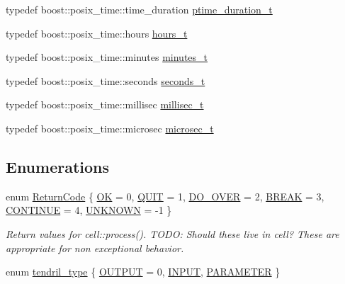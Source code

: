 \begin{DoxyCompactItemize}
\item 
typedef \*
boost\-::posix\-\_\-time\-::time\-\_\-duration \hyperlink{namespaceecto_a0952d5ebd059cbd79b978ecab9ec781c}{ptime\-\_\-duration\-\_\-t}
\item 
typedef boost\-::posix\-\_\-time\-::hours \hyperlink{namespaceecto_a477c167c1e1288b689db5872f650540e}{hours\-\_\-t}
\item 
typedef boost\-::posix\-\_\-time\-::minutes \hyperlink{namespaceecto_ad57e5ebf1455dd895ce11804e47669e5}{minutes\-\_\-t}
\item 
typedef boost\-::posix\-\_\-time\-::seconds \hyperlink{namespaceecto_ae14f91b3661ad9cb774590b15407742c}{seconds\-\_\-t}
\item 
typedef boost\-::posix\-\_\-time\-::millisec \hyperlink{namespaceecto_ab1f4721cc3b311f9615b3092d291260b}{millisec\-\_\-t}
\item 
typedef boost\-::posix\-\_\-time\-::microsec \hyperlink{namespaceecto_affe36dc8be6d20a6b8f7359655c8dc23}{microsec\-\_\-t}
\end{DoxyCompactItemize}
\subsection*{\-Enumerations}
\begin{DoxyCompactItemize}
\item 
enum \hyperlink{namespaceecto_a93d82cd28db695d53963fb696582762c}{\-Return\-Code} \{ \*
\hyperlink{namespaceecto_a93d82cd28db695d53963fb696582762ca047df8448e71f9fc10f4fe310b0a4de7}{\-O\-K} =  0, 
\hyperlink{namespaceecto_a93d82cd28db695d53963fb696582762ca6803dad912ff60afb751d630ba35f0b3}{\-Q\-U\-I\-T} =  1, 
\hyperlink{namespaceecto_a93d82cd28db695d53963fb696582762caa83c6c7678d27bc12006c6343229f841}{\-D\-O\-\_\-\-O\-V\-E\-R} =  2, 
\hyperlink{namespaceecto_a93d82cd28db695d53963fb696582762cab1a50eb818462b09d2aeed53db036ede}{\-B\-R\-E\-A\-K} =  3, 
\*
\hyperlink{namespaceecto_a93d82cd28db695d53963fb696582762caa00c877a06d58c100c7b0788c6c38b0a}{\-C\-O\-N\-T\-I\-N\-U\-E} =  4, 
\hyperlink{namespaceecto_a93d82cd28db695d53963fb696582762caed3dfd705e16962aacd0ba04103fa6cc}{\-U\-N\-K\-N\-O\-W\-N} =  -\/1
 \}
\begin{DoxyCompactList}\small\item\em \-Return values for cell\-::process(). \-T\-O\-D\-O\-: \-Should these live in cell? \-These are appropriate for non exceptional behavior. \end{DoxyCompactList}\item 
enum \hyperlink{namespaceecto_a02939764b22968505f82e425c83272c2}{tendril\-\_\-type} \{ \hyperlink{namespaceecto_a02939764b22968505f82e425c83272c2a2a607ed53342989a455e71bf3a78cb08}{\-O\-U\-T\-P\-U\-T} =  0, 
\hyperlink{namespaceecto_a02939764b22968505f82e425c83272c2adf3175f3e2ad3637b6fca943b4cc7672}{\-I\-N\-P\-U\-T}, 
\hyperlink{namespaceecto_a02939764b22968505f82e425c83272c2a39346743c7a624185996a561642a9aaa}{\-P\-A\-R\-A\-M\-E\-T\-E\-R}
 \}
\end{DoxyCompactItemize}
